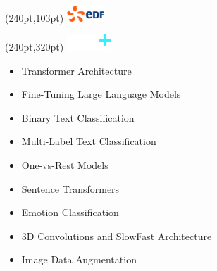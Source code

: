 \documentclass[10pt]{src/altacv}
\begin{document}
\begin{paracol}{2}

\begin{textblock*}{1cm}(240pt,103pt)
  {\includegraphics[height=0.6cm]{images/logo-edf.png}}
\end{textblock*}
\begin{textblock*}{1cm}(240pt,320pt)
  \colorbox{innov-plus-color}{\includegraphics[height=0.6cm]{images/logo-innov-plus.png}}
\end{textblock*}


\begin{itemize}
    \item Transformer Architecture
    \item Fine-Tuning Large Language Models
    \item Binary Text Classification
    \item Multi-Label Text Classification
    \item One-vs-Rest Models
    \item Sentence Transformers
\end{itemize}


\divider

\begin{itemize}
    \item Emotion Classification
    \item 3D Convolutions and SlowFast Architecture
    \item Image Data Augmentation
\end{itemize}

\divider


\end{paracol}
\end{document}
